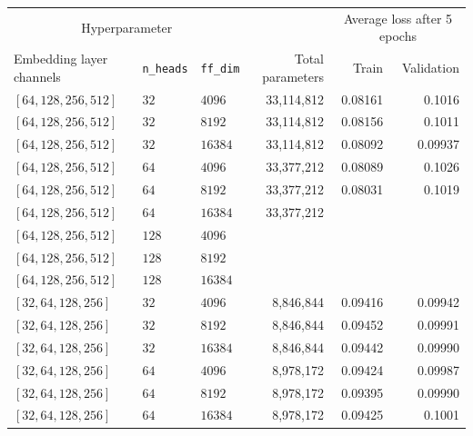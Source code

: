 \begin{table}[H]
  \centering
  \begin{adjustbox}{width=\textwidth}
    \begin{tabular}{lll|rrr}

      \multicolumn{3}{c}{Hyperparameter} && \multicolumn{2}{c}{Average loss
      after 5 epochs} \\

      Embedding layer channels & \texttt{n\_heads} & \texttt{ff\_dim} & Total
      parameters & Train & Validation\\

      \hline

      $[64, 128, 256, 512 ]$& $32$ & $4096$ & 33,114,812 & 0.08161 & 0.1016   \\
      $[64, 128, 256, 512 ]$& $32$ & $8192$ & 33,114,812 & 0.08156 & 0.1011 \\
      $[64, 128, 256, 512 ]$& $32$ & $16384$ & 33,114,812 & 0.08092 & 0.09937 \\[0.1cm]

      $[64, 128, 256, 512 ]$& $64$ & $4096$ & 33,377,212 & 0.08089 & 0.1026 \\
      $[64, 128, 256, 512 ]$& $64$ & $8192$ & 33,377,212 & 0.08031 & 0.1019 \\
      $[64, 128, 256, 512 ]$& $64$ & $16384$ & 33,377,212 && \\[0.1cm]

      $[64, 128, 256, 512 ]$& $128$ & $4096$ & && \\
      $[64, 128, 256, 512 ]$& $128$ & $8192$ & && \\
      $[64, 128, 256, 512 ]$& $128$ & $16384$ & && \\[0.5cm]



      $[32, 64, 128, 256 ]$& $32$ & $4096$ & 8,846,844 & 0.09416 & 0.09942 \\
      $[32, 64, 128, 256 ]$& $32$ & $8192$ & 8,846,844 & 0.09452 & 0.09991 \\
      $[32, 64, 128, 256 ]$& $32$ & $16384$ & 8,846,844 & 0.09442 & 0.09990 \\[0.1cm]

      $[32, 64, 128, 256 ]$& $64$ & $4096$ & 8,978,172 & 0.09424 & 0.09987 \\
      $[32, 64, 128, 256 ]$& $64$ & $8192$ & 8,978,172 & 0.09395 & 0.09990 \\
      $[32, 64, 128, 256 ]$& $64$ & $16384$ & 8,978,172 & 0.09425 & 0.1001 \\[0.1cm]


\end{tabular}
\end{adjustbox}
\end{table}
